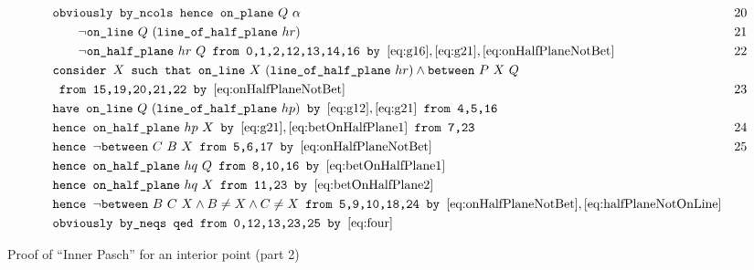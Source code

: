 \begin{boxedfigure}
\small
\begin{align*}
&\texttt{obviously by\_ncols hence } \code{on\_plane}\ Q\ \alpha& 20\\
&\qquad\neg\code{on\_line}\ Q\ (\code{line\_of\_half\_plane}\ hr) & 21\\
&\qquad\neg\code{on\_half\_plane}\ hr\ Q \texttt{ from 0,1,2,12,13,14,16 by } \eqref{eq:g16}, \eqref{eq:g21}, \eqref{eq:onHalfPlaneNotBet}& 22\\
&\texttt{consider } X \texttt{ such that } \code{on\_line}\ X\ (\code{line\_of\_half\_plane}\ hr) \wedge \between{P}{X}{Q}\\
&\texttt{ from 15,19,20,21,22 by } \eqref{eq:onHalfPlaneNotBet} & 23 \\
&\texttt{have } \code{on\_line}\ Q\ (\code{line\_of\_half\_plane}\ hp)\texttt{ by } \eqref{eq:g12}, \eqref{eq:g21} \texttt{ from 4,5,16}\\
&\texttt{hence } \code{on\_half\_plane}\ hp\ X\texttt{ by } \eqref{eq:g21}, \eqref{eq:betOnHalfPlane1} \texttt{ from 7,23} & 24\\
&\texttt{hence } \neg\between{C}{B}{X} \texttt{ from 5,6,17 by } \eqref{eq:onHalfPlaneNotBet} & 25\\
&\texttt{hence } \code{on\_half\_plane}\ hq\ Q \texttt{ from 8,10,16 by } \eqref{eq:betOnHalfPlane1}\\
&\texttt{hence } \code{on\_half\_plane}\ hq\ X \texttt{ from 11,23 by } \eqref{eq:betOnHalfPlane2}\\
&\texttt{hence } \neg\between{B}{C}{X} \wedge B \neq X \wedge C \neq X\texttt{ from 5,9,10,18,24 by } \eqref{eq:onHalfPlaneNotBet}, \eqref{eq:halfPlaneNotOnLine}\\
&\texttt{obviously by\_neqs qed from 0,12,13,23,25 by } \eqref{eq:four}
\end{align*}
\caption{Proof of ``Inner Pasch'' for an interior point (part 2)}
\label{fig:tricut12}
\end{boxedfigure}

